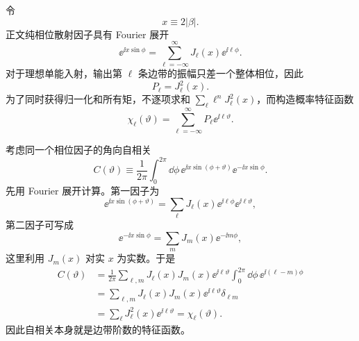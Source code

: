 \begin{derivation}
令
\begin{equation*}
 x\equiv2|\beta|.
\end{equation*}
正文纯相位散射因子具有 Fourier 展开
\begin{equation*}
 \ee^{\ii x\sin\phi}
 =\sum_{\ell=-\infty}^{\infty}
 J_\ell(x)\ee^{\ii\ell\phi}.
\end{equation*}
对于理想单能入射，输出第 $\ell$ 条边带的振幅只差一个整体相位，因此
\begin{equation*}
 P_\ell=J_\ell^2(x).
\end{equation*}
为了同时获得归一化和所有矩，不逐项求和 $\sum_\ell \ell^nJ_\ell^2(x)$，而构造概率特征函数
\begin{equation*}
 \chi_\ell(\vartheta)
 =\sum_{\ell=-\infty}^{\infty}
 P_\ell \ee^{\ii\ell\vartheta}.
\end{equation*}

考虑同一个相位因子的角向自相关
\begin{equation*}
 C(\vartheta)
 \equiv\frac1{2\pi}
 \int_0^{2\pi}\dd\phi\,
 \ee^{\ii x\sin(\phi+\vartheta)}
 \ee^{-\ii x\sin\phi}.
\end{equation*}
先用 Fourier 展开计算。第一因子为
\begin{equation*}
 \ee^{\ii x\sin(\phi+\vartheta)}
 =\sum_{\ell}J_\ell(x)
 \ee^{\ii\ell\phi}\ee^{\ii\ell\vartheta},
\end{equation*}
第二因子可写成
\begin{equation*}
 \ee^{-\ii x\sin\phi}
 =\sum_mJ_m(x)\ee^{-\ii m\phi},
\end{equation*}
这里利用 $J_m(x)$ 对实 $x$ 为实数。于是
\begin{align*}
 C(\vartheta)
 &=\frac1{2\pi}
 \sum_{\ell,m}J_\ell(x)J_m(x)\ee^{\ii\ell\vartheta}
 \int_0^{2\pi}\dd\phi\,
 \ee^{\ii(\ell-m)\phi}\\
 &=\sum_{\ell,m}J_\ell(x)J_m(x)\ee^{\ii\ell\vartheta}
 \delta_{\ell m}\\
 &=\sum_\ell J_\ell^2(x)\ee^{\ii\ell\vartheta}
 =\chi_\ell(\vartheta).
\end{align*}
因此自相关本身就是边带阶数的特征函数。


\end{derivation}
